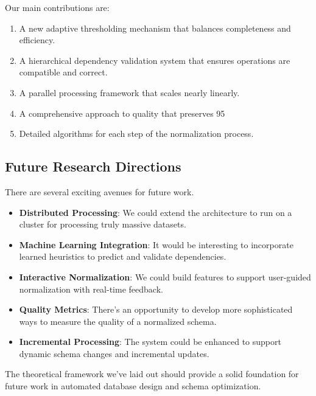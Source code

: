 \documentclass[sigconf]{acmart}
\begin{document}
Our main contributions are:

\begin{enumerate}
\item A new adaptive thresholding mechanism that balances completeness and efficiency.
\item A hierarchical dependency validation system that ensures operations are compatible and correct.
\item A parallel processing framework that scales nearly linearly.
\item A comprehensive approach to quality that preserves 95%
\item Detailed algorithms for each step of the normalization process.
\end{enumerate}

\subsection{Future Research Directions}

There are several exciting avenues for future work.

\begin{itemize}
\item \textbf{Distributed Processing}: We could extend the architecture to run on a cluster for processing truly massive datasets.
\item \textbf{Machine Learning Integration}: It would be interesting to incorporate learned heuristics to predict and validate dependencies.
\item \textbf{Interactive Normalization}: We could build features to support user-guided normalization with real-time feedback.
\item \textbf{Quality Metrics}: There's an opportunity to develop more sophisticated ways to measure the quality of a normalized schema.
\item \textbf{Incremental Processing}: The system could be enhanced to support dynamic schema changes and incremental updates.
\end{itemize}

The theoretical framework we've laid out should provide a solid foundation for future work in automated database design and schema optimization.



\end{document}
